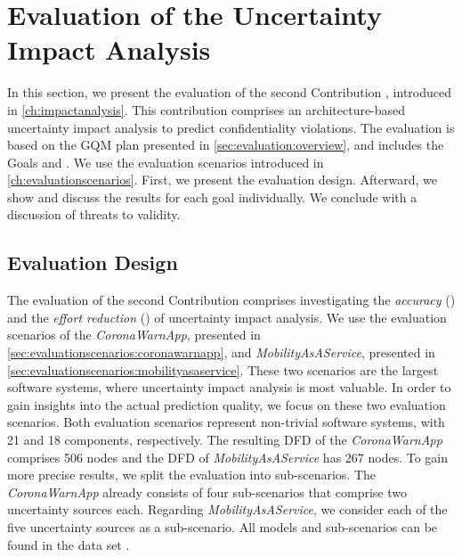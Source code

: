 \section{Evaluation of the Uncertainty Impact Analysis}%
\label{sec:evaluation:second}

In this section, we present the evaluation of the second Contribution , introduced in \autoref{ch:impactanalysis}.
This contribution comprises an architecture-based uncertainty impact analysis to predict confidentiality violations.
The evaluation is based on the \ac{GQM} plan presented in \autoref{sec:evaluation:overview}, and includes the Goals  and .
We use the evaluation scenarios introduced in \autoref{ch:evaluationscenarios}.
First, we present the evaluation design.
Afterward, we show and discuss the results for each goal individually.
We conclude with a discussion of threats to validity.


\subsection{Evaluation Design}

The evaluation of the second Contribution  comprises investigating the \emph{accuracy} () and the \emph{effort reduction} () of uncertainty impact analysis.
We use the evaluation scenarios of the \emph{CoronaWarnApp}, presented in \autoref{sec:evaluationscenarios:coronawarnapp}, and \emph{MobilityAsAService}, presented in \autoref{sec:evaluationscenarios:mobilityasaservice}.
These two scenarios are the largest software systems, where uncertainty impact analysis is most valuable.
In order to gain insights into the actual prediction quality, we focus on these two evaluation scenarios.
Both evaluation scenarios represent non-trivial software systems, with 21 and 18 components, respectively.
The resulting \ac{DFD} of the \emph{CoronaWarnApp} comprises 506 nodes and the \ac{DFD} of \emph{MobilityAsAService} has 267 nodes.
To gain more precise results, we split the evaluation into sub-scenarios.
The \emph{CoronaWarnApp} already consists of four sub-scenarios that comprise two uncertainty sources each.
Regarding \emph{MobilityAsAService}, we consider each of the five uncertainty sources as a sub-scenario.
All models and sub-scenarios can be found in the data set \cite{dataset}.

